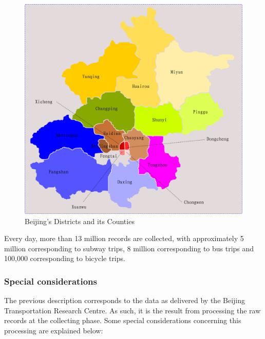 \documentclass{article}
\begin{document}
\begin{figure}
  \centering
  \includegraphics[width=.8\linewidth]{./images/beijing_18areas.png}
  \caption{Beijing's Districts and its Counties}
  \label{fig:data/18areas}
\end{figure}

Every day, more than 13 million records are collected, with approximately 5 million corresponding to subway trips, 8 million corresponding to bus trips and 100,000 corresponding to bicycle trips.

\subsubsection{Special considerations}
The previous description corresponds to the data as delivered by the Beijing Transportation Research Centre. As such, it is the result from processing the raw records at the collecting phase. Some special considerations concerning this processing are explained below:
\end{document}
